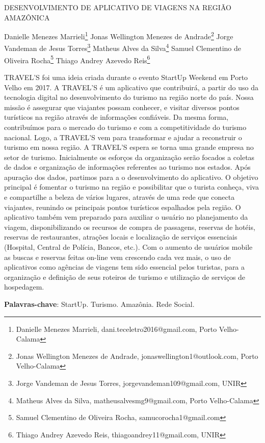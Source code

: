 \documentclass[article,12pt,onesidea,4paper,english,brazil]{abntex2}
\begin{document}
	
	
	\frenchspacing 
	
	\begin{center}
		\LARGE DESENVOLVIMENTO DE APLICATIVO DE VIAGENS NA REGIÃO AMAZÔNICA
		
		\normalsize
		Danielle Menezes Marrieli\footnote{Danielle Menezes Marrieli, dani.teceletro2016@gmail.com, Porto Velho-Calama} 
		Jonas Wellington Menezes de Andrade\footnote{Jonas Wellington Menezes de Andrade, jonaswellington1@outlook.com, Porto Velho-Calama} 
		Jorge Vandeman de Jesus Torres\footnote{Jorge Vandeman de Jesus Torres, jorgevandeman109@gmail.com, UNIR} 
		Matheus Alves da Silva\footnote{Matheus Alves da Silva, matheusalvesmg9@gmail.com, Porto Velho-Calama}
		Samuel Clementino de Oliveira Rocha\footnote{Samuel Clementino de Oliveira Rocha, samucorocha1@gmail.com}
		Thiago Andrey Azevedo Reis\footnote{Thiago Andrey Azevedo Reis, thiagoandrey11@gmail.com, UNIR} 
	\end{center}
	
	\noindent TRAVEL'S foi uma ideia criada durante o evento StartUp Weekend em Porto Velho em 2017. A TRAVEL'S é um aplicativo que contribuirá, a partir do uso da tecnologia
	digital no desenvolvimento do turismo na região norte do país. Nossa missão é
	assegurar que viajantes possam conhecer, e visitar diversos pontos turísticos na
	região através de informações confiáveis. Da mesma forma, contribuímos para o
	mercado do turismo e com a competitividade do turismo nacional. Logo, a TRAVEL'S
	vem para transformar e ajudar a reconstruir o turismo em nossa região. A TRAVEL'S
	espera se torna uma grande empresa no setor de turismo. Inicialmente os esforços
	da organização serão focados a coletas de dados e organização de informações
	referentes ao turismo nos estados. Após apuração dos dados, partimos para a o
	desenvolvimento do aplicativo. O objetivo principal é fomentar o turismo na região e
	possibilitar que o turista conheça, viva e compartilhe a beleza de vários lugares,
	através de uma rede que conecta viajantes, reunindo os principais pontos turísticos
	espalhados pela região. O aplicativo também vem preparado para auxiliar o usuário
	no planejamento da viagem, disponibilizando os recursos de compra de passagens,
	reservas de hotéis, reservas de restaurantes, atrações locais e localização de
	serviços essenciais (Hospital, Central de Polícia, Bancos, etc.). Com o aumento de
	usuários mobile as buscas e reservas feitas on-line vem crescendo cada vez mais, o
	uso de aplicativos como agências de viagens tem sido essencial pelos turistas, para
	a organização e definição de seus roteiros de turismo e utilização de serviços de
	hospedagem.
	
	\vspace{\onelineskip}
	
	\noindent
	\textbf{Palavras-chave}: StartUp. Turismo. Amazônia. Rede Social.
	
\end{document}
